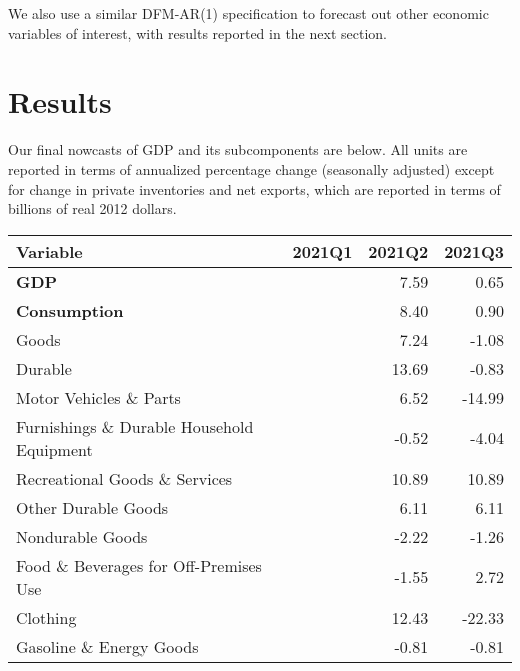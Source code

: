 \documentclass[11pt, letterpaper]{article}\usepackage[]{graphicx}\usepackage[]{color}
\begin{document}
We also use a similar DFM-AR(1) specification to forecast out other economic variables of interest, with results reported in the next section.


\section{Results}
Our final nowcasts of GDP and its subcomponents are below. All units are reported in terms of annualized percentage change (seasonally adjusted) except for change in private inventories and net exports, which are reported in terms of billions of real 2012 dollars.
\begin{table}[H]
\centering
\begingroup\fontsize{10pt}{12pt}\selectfont
\begin{tabular}{lrrr}
  \hline
Variable & 2021Q1 & 2021Q2 & 2021Q3 \\ 
  \hline
\hspace{0mm} \textbf{GDP} &  & 7.59 & 0.65 \\ 
  \hspace{0mm} \textbf{Consumption} &  & 8.40 & 0.90 \\ 
  \hspace{8mm}  Goods &  & 7.24 & -1.08 \\ 
  \hspace{16mm}  Durable &  & 13.69 & -0.83 \\ 
  \hspace{24mm}  Motor Vehicles \& Parts &  & 6.52 & -14.99 \\ 
  \hspace{24mm}  Furnishings \& Durable Household Equipment &  & -0.52 & -4.04 \\ 
  \hspace{24mm}  Recreational Goods \& Services &  & 10.89 & 10.89 \\ 
  \hspace{24mm}  Other Durable Goods &  & 6.11 & 6.11 \\ 
  \hspace{16mm}  Nondurable Goods &  & -2.22 & -1.26 \\ 
  \hspace{24mm}  Food \& Beverages for Off-Premises Use &  & -1.55 & 2.72 \\ 
  \hspace{24mm}  Clothing &  & 12.43 & -22.33 \\ 
  \hspace{24mm}  Gasoline \& Energy Goods &  & -0.81 & -0.81 \\ 

\end{tabular}
\end{table}
\end{document}
